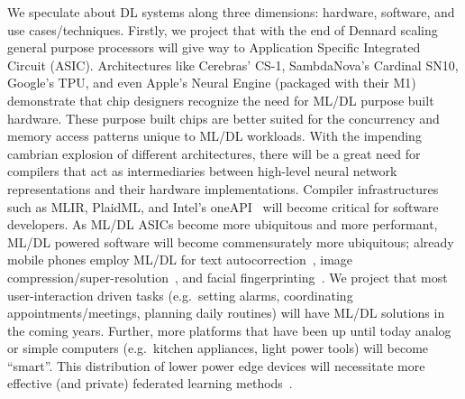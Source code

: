 We speculate about DL systems along three dimensions: hardware, software, and use cases/techniques.
Firstly, we project that with the end of Dennard scaling~\cite{CARDOSO201717} general purpose processors will give way to Application Specific Integrated Circuit (ASIC).
Architectures like Cerebras' CS-1, SambdaNova's Cardinal SN10, Google's TPU, and even Apple's Neural Engine (packaged with their M1) demonstrate that chip designers recognize the need for ML/DL purpose built hardware.
These purpose built chips are better suited for the concurrency and memory access patterns unique to ML/DL workloads.
With the impending cambrian explosion of different architectures, there will be a great need for compilers that act as intermediaries between high-level neural network representations and their hardware implementations.
Compiler infrastructures such as MLIR, PlaidML, and Intel's oneAPI~\cite{oneapi} will become critical for software developers.
As ML/DL ASICs become more ubiquitous and more performant, ML/DL powered software will become commensurately more ubiquitous;
already mobile phones employ ML/DL for text autocorrection~\cite{DBLP:journals/corr/abs-1709-06429}, image compression/super-resolution~\cite{DBLP:journals/corr/RomanoIM16}, and facial fingerprinting~\cite{cuda_toolkit}.
We project that most user-interaction driven tasks (e.g.\ setting alarms, coordinating appointments/meetings, planning daily routines) will have ML/DL solutions in the coming years.
Further, more platforms that have been up until today analog or simple computers (e.g.\ kitchen appliances, light power tools) will become ``smart''.
This distribution of lower power edge devices will necessitate more effective (and private) federated learning methods~\cite{48690}.